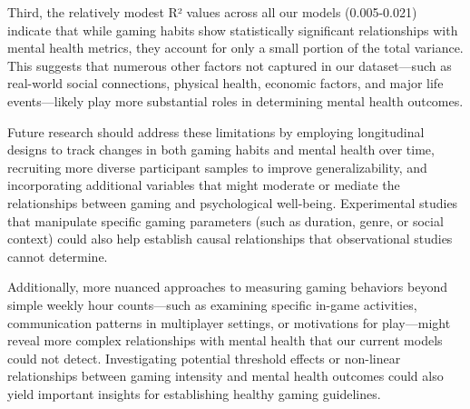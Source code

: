 \documentclass[12pt]{article}
\begin{document}
Third, the relatively modest R² values across all our models (0.005-0.021) indicate that while gaming habits show statistically significant relationships with mental health metrics, they account for only a small portion of the total variance. This suggests that numerous other factors not captured in our dataset—such as real-world social connections, physical health, economic factors, and major life events—likely play more substantial roles in determining mental health outcomes.

Future research should address these limitations by employing longitudinal designs to track changes in both gaming habits and mental health over time, recruiting more diverse participant samples to improve generalizability, and incorporating additional variables that might moderate or mediate the relationships between gaming and psychological well-being. Experimental studies that manipulate specific gaming parameters (such as duration, genre, or social context) could also help establish causal relationships that observational studies cannot determine.

Additionally, more nuanced approaches to measuring gaming behaviors beyond simple weekly hour counts—such as examining specific in-game activities, communication patterns in multiplayer settings, or motivations for play—might reveal more complex relationships with mental health that our current models could not detect. Investigating potential threshold effects or non-linear relationships between gaming intensity and mental health outcomes could also yield important insights for establishing healthy gaming guidelines.
\end{document}
